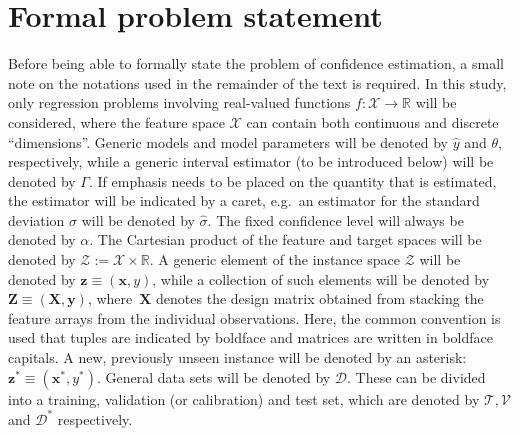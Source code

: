 \documentclass[smallcondensed]{svjour3}
\begin{document}
\section{Formal problem statement}\label{section:problem_statement}

    Before being able to formally state the problem of confidence estimation, a small note on the notations used in the remainder of the text is required. In this study, only regression problems involving real-valued functions $f:\mathcal{X}\rightarrow\mathbb{R}$ will be considered, where the feature space $\mathcal{X}$ can contain both continuous and discrete ``dimensions''. Generic models and model parameters will be denoted by $\hat{y}$ and $\theta$, respectively, while a generic interval estimator (to be introduced below) will be denoted by $\Gamma$. If emphasis needs to be placed on the quantity that is estimated, the estimator will be indicated by a caret, e.g.\ an estimator for the standard deviation $\sigma$ will be denoted by $\hat{\sigma}$. The fixed confidence level will always be denoted by $\alpha$. The Cartesian product of the feature and target spaces will be denoted by $\mathcal{Z}:=\mathcal{X}\times\mathbb{R}$. A generic element of the instance space $\mathcal{Z}$ will be denoted by $\mathbf{z}\equiv(\mathbf{x},y)$, while a collection of such elements will be denoted by $\mathbf{Z}\equiv(\mathbf{X},\mathbf{y})$, where~$\mathbf{X}$ denotes the design matrix obtained from stacking the feature arrays from the individual observations. Here, the common convention is used that tuples are indicated by boldface and matrices are written in boldface capitals. A new, previously unseen instance will be denoted by an asterisk: $\mathbf{z}^*\equiv(\mathbf{x}^*,y^*)$. General data sets will be denoted by $\mathcal{D}$. These can be divided into a training, validation (or calibration) and test set, which are denoted by $\mathcal{T},\mathcal{V}$ and $\mathcal{D}^*$ respectively.
\end{document}
